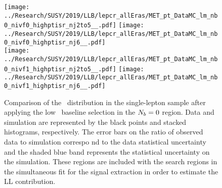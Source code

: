 \begin{figure}[!htb]
	\begin{center}
  \texttt{[image: ../Research/SUSY/2019/LLB/lepcr\_allEras/MET\_pt\_DataMC\_lm\_nb0\_nivf0\_highptisr\_nj2to5\_\_.pdf]}
  \texttt{[image: ../Research/SUSY/2019/LLB/lepcr\_allEras/MET\_pt\_DataMC\_lm\_nb0\_nivf0\_highptisr\_nj6\_\_.pdf]} \\
  \texttt{[image: ../Research/SUSY/2019/LLB/lepcr\_allEras/MET\_pt\_DataMC\_lm\_nb0\_nivf1\_highptisr\_nj2to5\_\_.pdf]}
  \texttt{[image: ../Research/SUSY/2019/LLB/lepcr\_allEras/MET\_pt\_DataMC\_lm\_nb0\_nivf1\_highptisr\_nj6\_\_.pdf]} \\
	\end{center}
	\caption{Comparison of the \met~distribution in the single-lepton sample after applying the low \dm~baseline selection in the $N_{b}=0$ region. Data and simulation are represented by the black points and stacked histograms, respectively. The error bars on the ratio of observed data to simulation correspo    nd to the data statistical uncertainty and the shaded blue band represents the statistical uncertainty on the simulation. These regions are included with the search regions in the simultaneous fit for the signal extraction in order to estimate the LL contribution.
	 }
	\label{fig:llb-1lcr-datavsmc-lm-nb0}
\end{figure}
